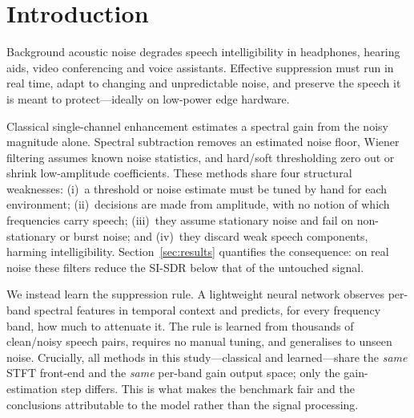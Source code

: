 \documentclass[runningheads]{llncs}
\begin{document}
\section{Introduction}
Background acoustic noise degrades speech intelligibility in headphones,
hearing aids, video conferencing and voice assistants. Effective suppression
must run in real time, adapt to changing and unpredictable noise, and preserve
the speech it is meant to protect---ideally on low-power edge hardware.

Classical single-channel enhancement estimates a spectral gain from the noisy
magnitude alone. Spectral subtraction removes an estimated noise floor,
Wiener filtering assumes known noise statistics, and hard/soft thresholding
zero out or shrink low-amplitude coefficients. These methods share four
structural weaknesses: (i)~a threshold or noise estimate must be tuned by hand
for each environment; (ii)~decisions are made from amplitude, with no notion of
which frequencies carry speech; (iii)~they assume stationary noise and fail on
non-stationary or burst noise; and (iv)~they discard weak speech components,
harming intelligibility. Section~\ref{sec:results} quantifies the consequence:
on real noise these filters reduce the SI-SDR below that of the untouched
signal.

We instead learn the suppression rule. A lightweight neural network observes
per-band spectral features in temporal context and predicts, for every
frequency band, how much to attenuate it. The rule is learned from thousands of
clean/noisy speech pairs, requires no manual tuning, and generalises to unseen
noise. Crucially, all methods in this study---classical and learned---share the
\emph{same} STFT front-end and the \emph{same} per-band gain output space; only
the gain-estimation step differs. This is what makes the benchmark fair and the
conclusions attributable to the model rather than the signal processing.
\end{document}
